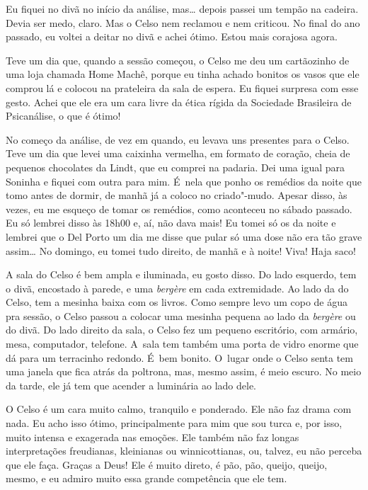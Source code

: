 Eu fiquei no divã no início da análise, mas… depois passei um
tempão na cadeira. Devia ser medo, claro. Mas o Celso nem reclamou e nem
criticou. No final do ano passado, eu voltei a deitar no divã e achei
ótimo. Estou mais corajosa agora.

Teve um dia que, quando a sessão começou, o Celso me deu um cartãozinho
de uma loja chamada Home Machê, porque eu tinha achado bonitos os vasos
que ele comprou lá e colocou na prateleira da sala de espera. Eu fiquei
surpresa com esse gesto. Achei que ele era um cara livre da ética rígida
da Sociedade Brasileira de Psicanálise, o que é ótimo!

No começo da análise, de vez em quando, eu levava uns presentes para o
Celso. Teve um dia que levei uma caixinha vermelha, em formato de
coração, cheia de pequenos chocolates da Lindt, que eu comprei na
padaria. Dei uma igual para Soninha e fiquei com outra para mim. É~nela
que ponho os remédios da noite que tomo antes de dormir, de manhã já a
coloco no criado"-mudo. Apesar disso, às vezes, eu me esqueço de tomar os
remédios, como aconteceu no sábado passado. Eu só lembrei disso às 18h00
e, aí, não dava mais! Eu tomei só os da noite e lembrei que o Del Porto
um dia me disse que pular só uma dose não era tão grave assim… No
domingo, eu tomei tudo direito, de manhã e à noite! Viva! Haja saco!

A sala do Celso é bem ampla e iluminada, eu gosto disso. Do lado
esquerdo, tem o divã, encostado à parede, e uma \emph{bergère} em cada
extremidade. Ao lado da do Celso, tem a mesinha baixa com os livros.
Como sempre levo um copo de água pra sessão, o Celso passou a colocar
uma mesinha pequena ao lado da \emph{bergère} ou do divã. Do lado
direito da sala, o Celso fez um pequeno escritório, com armário, mesa,
computador, telefone. A~sala tem também uma porta de vidro enorme que dá
para um terracinho redondo. É~bem bonito. O~lugar onde o Celso senta tem
uma janela que fica atrás da poltrona, mas, mesmo assim, é meio escuro.
No meio da tarde, ele já tem que acender a luminária ao lado dele.

O Celso é um cara muito calmo, tranquilo e ponderado. Ele não faz drama
com nada. Eu acho isso ótimo, principalmente para mim que sou turca e,
por isso, muito intensa e exagerada nas emoções. Ele também não faz
longas interpretações freudianas, kleinianas ou winnicottianas, ou,
talvez, eu não perceba que ele faça. Graças a Deus! Ele é muito direto,
é pão, pão, queijo, queijo, mesmo, e eu admiro muito essa grande
competência que ele tem.

